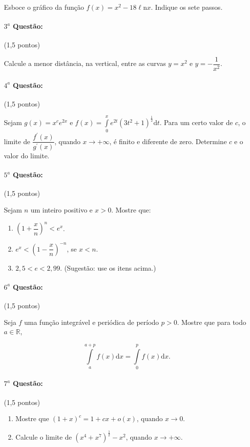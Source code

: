 \documentclass[12pt,a4paper]{article}
\newcommand{\dd}{\mathrm{d}}
\newcommand{\Ln}{\ell\mathrm{n}}
\begin{document}
Esboce o gráfico da função $f(x)=x^2-18\Ln{x}$. Indique os sete passos.

\paragraph{$3^a$ Questão:} (1,5 pontos)

Calcule a menor distância, na vertical, entre as curvas $y=x^2$ e $y=-\dfrac{1}{x^2}$.

\paragraph{$4^a$ Questão:} (1,5 pontos)

Sejam $g(x)=x^c e^{2x}$ e $f(x)= \displaystyle\int\limits_{0}^x e^{2t}(3t^2+1)^{\frac{1}{2}} \dd t$. Para um certo valor de $c$, o limite de $\dfrac{f^\prime(x)}{g^\prime(x)}$,
quando $x \rightarrow +\infty$, é finito e diferente de zero. Determine $c$ e o valor do limite.

\paragraph{$5^a$ Questão:} (1,5 pontos)

Sejam $n$ um inteiro positivo e $x>0$. Mostre que:
\begin{enumerate}[label=(\alph*)]
\item $\left( 1+ \dfrac{x}{n} \right) ^n < e^x$.
\item $e^x<\left( 1-\dfrac{x}{n} \right)^{-n}$, se $x<n$.
\item $2,5<e<2,99$. (Sugestão: use os itens acima.)
\end{enumerate}

\paragraph{$6^a$ Questão:} (1,5 pontos)

Seja $f$ uma função integrável e periódica de período $p>0$. Mostre que para todo $a \in \mathbb{R}$, 

$$ \displaystyle\int\limits_a^{a+p} f(x) \dd x =  \displaystyle\int\limits_0^p f(x) \dd x .$$

\paragraph{$7^a$ Questão:} (1,5 pontos)

\begin{enumerate}[label=(\alph*)]
\item Mostre que $(1+x)^c = 1+ cx + o(x)$, quando $x \rightarrow 0$.
\item Calcule o limite de $(x^4+x^7)^\frac{1}{2} - x^2$, quando $x \rightarrow + \infty$.
\end{enumerate}
\end{document}
